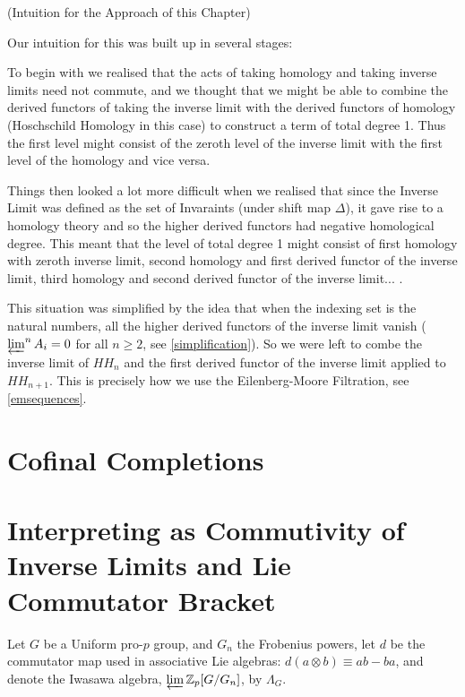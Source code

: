 \begin{example} (Intuition for the Approach of this Chapter)


Our intuition for this was built up in several stages:

To begin with we realised that the acts of taking homology and taking inverse limits need not commute, and we thought that we might be able to combine the derived functors of taking the inverse limit with the derived functors of homology (Hoschschild Homology in this case) to construct a term of total degree 1. Thus the first level might consist of the zeroth level of the inverse limit with the first level of the homology and vice versa.

Things then looked a lot more difficult when we realised that since the Inverse Limit was defined as the set of Invaraints (under shift map $\Delta$), it gave rise to a homology theory and so the higher derived functors had negative homological degree. This meant that the level of total degree 1 might consist of first homology with zeroth inverse limit, second homology and first derived functor of the inverse limit, third homology and second derived functor of the inverse limit... .

This situation was simplified by the idea that when the indexing set is the natural numbers, all the higher derived functors of the inverse limit vanish ($\varprojlim^n A_i = 0$ for all $n\geq 2$, see \ref{simplification}). So we were left to combe the inverse limit of $HH_n$ and the first derived functor of the inverse limit applied to $HH_{n+1}$. This is precisely how we use the Eilenberg-Moore Filtration, see \ref{emsequences}.
  
\end{example}

\section{Cofinal Completions}
\newpage



\section{Interpreting as Commutivity of Inverse Limits and Lie Commutator Bracket}

Let $G$ be a Uniform pro-$p$ group, and $G_n$ the Frobenius powers, let $d$ be the commutator map used in associative Lie algebras: $d(a \otimes b ) \equiv ab - ba$, and denote the Iwasawa algebra, $\varprojlim \mathbb Z_p [G/G_n]$, by $\Lambda_G$.


